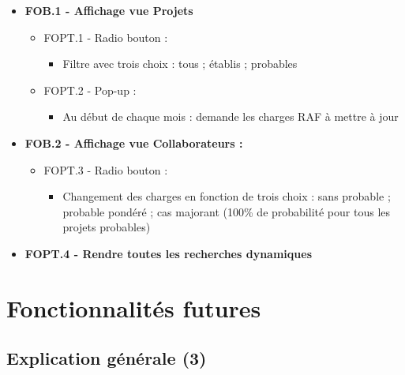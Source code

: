 \documentclass[french]{report}
\begin{document}
\begin{itemize}[label=\textbullet, font=\normalfont \color{blue}]
  \item{\textbf{FOB.1 - Affichage vue Projets}}

  \begin{itemize}[label=\textbullet]
    \item{FOPT.1 - Radio bouton : }

    \begin{itemize}[label=-]
      \item{Filtre avec trois choix : tous ; établis ; probables}
    \end{itemize}

    \item{FOPT.2 - Pop-up :}

    \begin{itemize}[label=-]
      \item{Au début de chaque mois : demande les charges RAF à mettre à jour}
    \end{itemize}

  \end{itemize}

  \item{\textbf{FOB.2 - Affichage vue Collaborateurs : }}

  \begin{itemize}[label=\textbullet]
    \item{FOPT.3 - Radio bouton :}

    \begin{itemize}[label=-]
      \item{Changement des charges en fonction de trois choix : sans probable ;
       probable pondéré ; cas majorant (100\% de probabilité pour tous les
       projets probables)}
    \end{itemize}

  \end{itemize}

  \item{\textbf{FOPT.4 - Rendre toutes les recherches dynamiques}}

\end{itemize}

\newpage

  \section{Fonctionnalités futures}

\subsection{Explication générale (3)}
\end{document}
